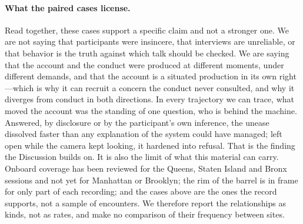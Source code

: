 \paragraph{What the paired cases license.}
Read together, these cases support a specific claim and not a stronger one. We
are not saying that participants were insincere, that interviews are
unreliable, or that behavior is the truth against which talk should be checked.
We are saying that the account and the conduct were produced at different
moments, under different demands, and that the account is a situated production
in its own right---which is why it can recruit a concern the conduct never
consulted, and why it diverges from conduct in both directions. In every
trajectory we can trace, what moved the account was the standing of one
question, who is behind the machine. Answered, by disclosure or by the
participant's own inference, the unease dissolved faster than any explanation
of the system could have managed; left open while the camera kept looking, it
hardened into refusal. That is the finding the Discussion builds on. It is also
the limit of what this material can carry. Onboard coverage has been reviewed
for the Queens, Staten Island and Bronx sessions and not yet for Manhattan or
Brooklyn; the rim of the barrel is in frame for only part of each recording;
and the cases above are the ones the record supports, not a sample of
encounters. We therefore report the relationships as kinds, not as rates, and
make no comparison of their frequency between sites.
